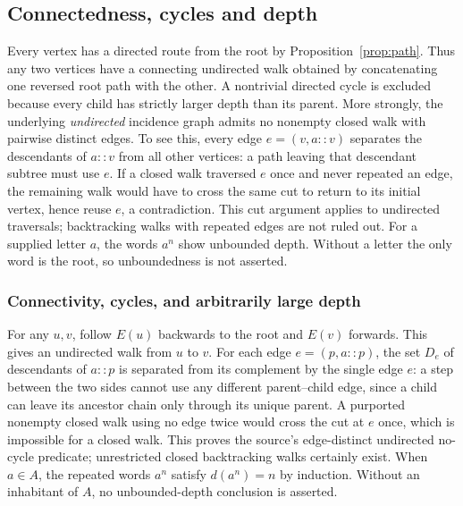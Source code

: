\documentclass[11pt,reqno]{amsart}
\theoremstyle{definition}\newtheorem{definition}[theorem]{Definition}
\theoremstyle{remark}\newtheorem{remark}[theorem]{Remark}
\begin{document}
\subsection{Connectedness, cycles and depth}\label{main:sub-03}
Every vertex has a directed route from the root by Proposition~\ref{prop:path}. Thus any two vertices have a connecting undirected walk obtained by concatenating one reversed root path with the other. A nontrivial directed cycle is excluded because every child has strictly larger depth than its parent. More strongly, the underlying \emph{undirected} incidence graph admits no nonempty closed walk with pairwise distinct edges. To see this, every edge $e=(v,a::v)$ separates the descendants of $a::v$ from all other vertices: a path leaving that descendant subtree must use $e$. If a closed walk traversed $e$ once and never repeated an edge, the remaining walk would have to cross the same cut to return to its initial vertex, hence reuse $e$, a contradiction. This cut argument applies to undirected traversals; backtracking walks with repeated edges are not ruled out. For a supplied letter $a$, the words $a^n$ show unbounded depth. Without a letter the only word is the root, so unboundedness is not asserted.


\medskip
\subsubsection*{Connectivity, cycles, and arbitrarily large depth}\label{supp:2-3}
For any $u,v$, follow $E(u)$ backwards to the root and $E(v)$ forwards. This gives an undirected walk from $u$ to $v$. For each edge $e=(p,a::p)$, the set $D_e$ of descendants of $a::p$ is separated from its complement by the single edge $e$: a step between the two sides cannot use any different parent--child edge, since a child can leave its ancestor chain only through its unique parent. A purported nonempty closed walk using no edge twice would cross the cut at $e$ once, which is impossible for a closed walk. This proves the source's edge-distinct undirected no-cycle predicate; unrestricted closed backtracking walks certainly exist. When $a\in A$, the repeated words $a^n$ satisfy $d(a^n)=n$ by induction. Without an inhabitant of $A$, no unbounded-depth conclusion is asserted.
\medskip
\end{document}
